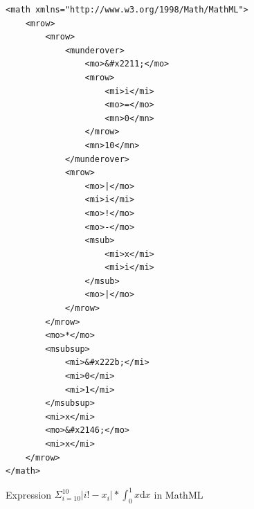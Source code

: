 \documentclass[11pt,oneside,final]{fithesis2}
\begin{document}
\begin{figure}[!ht]
\lstset{language=XML,frame=lines}
\begin{lstlisting}
<math xmlns="http://www.w3.org/1998/Math/MathML">
	<mrow>
		<mrow>
			<munderover>
				<mo>&#x2211;</mo>
				<mrow>
					<mi>i</mi>
					<mo>=</mo>
					<mn>0</mn>
				</mrow>
				<mn>10</mn>
			</munderover>
			<mrow>
				<mo>|</mo>
				<mi>i</mi>
				<mo>!</mo>
				<mo>-</mo>
				<msub>
					<mi>x</mi>
					<mi>i</mi>
				</msub>
				<mo>|</mo>
			</mrow>
		</mrow>
		<mo>*</mo>
		<msubsup>
			<mi>&#x222b;</mi>
			<mi>0</mi>
			<mi>1</mi>
		</msubsup>
		<mi>x</mi>
		<mo>&#x2146;</mo>
		<mi>x</mi>
	</mrow>
</math>
\end{lstlisting}
\caption{Expression $\Sigma_{i=10}^{10}|i!-x_i|*\int_0^1 x \mathrm{d} x$ in MathML}
\label{appendix:xml:example2}
\end{figure}

\clearpage
\markboth{}{}
\printindex
\end{document}
